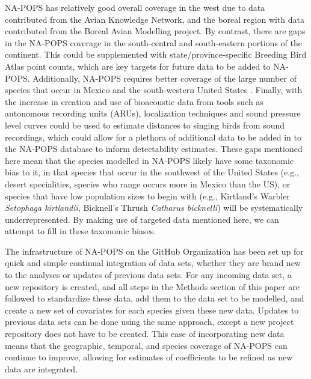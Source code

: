 \par NA-POPS has relatively good overall coverage in the west due to data contributed from the Avian Knowledge Network, and the boreal region with data contributed from the Boreal Avian Modelling project. By contrast, there are gaps in the NA-POPS coverage in the south-central and south-eastern portions of the continent. This could be supplemented with state/province-specific Breeding Bird Atlas point counts, which are key targets for future data to be added to NA-POPS. Additionally, NA-POPS requires better coverage of the large number of species that occur in Mexico and the south-western United States \citep{ruiz_gutierrez_proalas_2020}. Finally, with the increase in creation and use of bioacoustic data from tools such as autonomous recording units (ARUs), localization techniques \citep{hedley_direction--arrival_2017} and sound pressure level curves \citep{yip_sound_2020} could be used to estimate distances to singing birds from sound recordings, which could allow for a plethora of additional data to be added in to the NA-POPS database to inform detectability estimates. These gaps mentioned here mean that the species modelled in NA-POPS likely have some taxonomic bias to it, in that species that occur in the southwest of the United States (e.g., desert specialities, species who range occurs more in Mexico than the US), or species that have low population sizes to begin with (e.g., Kirtland’s Warbler \textit{Setophaga kirtlandii}, Bicknell’s Thrush \textit{Catharus bicknelli}) will be systematically underrepresented. By making use of targeted data mentioned here, we can attempt to fill in these taxonomic biases. 

\par The infrastructure of NA-POPS on the GitHub Organization has been set up for quick and simple continual integration of data sets, whether they are brand new to the analyses or updates of previous data sets. For any incoming data set, a new repository is created, and all steps in the Methods section of this paper are followed to standardize these data, add them to the data set to be modelled, and create a new set of covariates for each species given these new data. Updates to previous data sets can be done using the same approach, except a new project repository does not have to be created. This ease of incorporating new data means that the geographic, temporal, and species coverage of NA-POPS can continue to improve, allowing for estimates of coefficients to be refined as new data are integrated.

